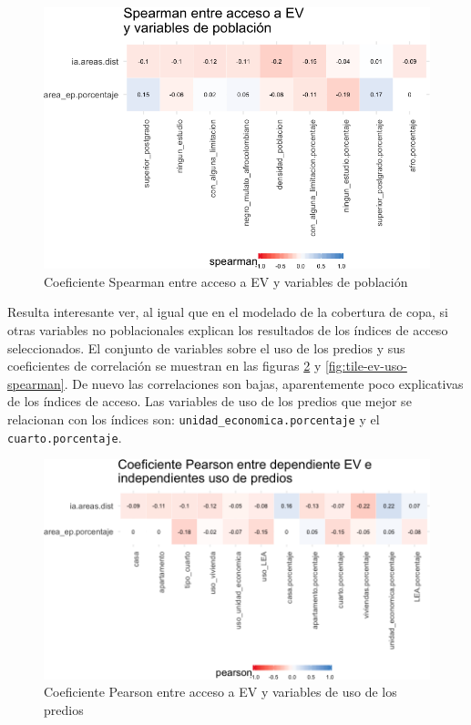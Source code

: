 \documentclass[12pt,]{book}
\begin{document}
\begin{figure}
\includegraphics[width=1\linewidth]{tesis-unigis_files/figure-latex/tile-ev-poblacion-spearman-1} \caption{Coeficiente Spearman entre acceso a EV y variables de población}\label{fig:tile-ev-poblacion-spearman}
\end{figure}

Resulta interesante ver, al igual que en el modelado de la cobertura de
copa, si otras variables no poblacionales explican los resultados de los
índices de acceso seleccionados. El conjunto de variables sobre el uso
de los predios y sus coeficientes de correlación se muestran en las
figuras \ref{fig:tile-ev-uso-pearson} y \ref{fig:tile-ev-uso-spearman}.
De nuevo las correlaciones son bajas, aparentemente poco explicativas de
los índices de acceso. Las variables de uso de los predios que mejor se
relacionan con los índices son: \texttt{unidad\_economica.porcentaje} y
el \texttt{cuarto.porcentaje}.

\begin{figure}
\includegraphics[width=1\linewidth]{tesis-unigis_files/figure-latex/tile-ev-uso-pearson-1} \caption{Coeficiente Pearson entre acceso a EV y variables de uso de los predios}\label{fig:tile-ev-uso-pearson}
\end{figure}
\end{document}
